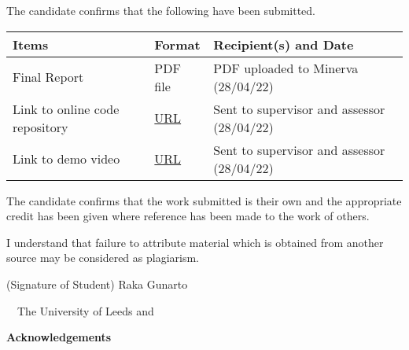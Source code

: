 \frontcover

\clearpage

\noindent The candidate confirms that the following have been submitted.\\


\begin{table}[ht!]
\begin{tabular}{|p{}|p{}|p{}|}
\hline 
Items & Format & Recipient(s) and Date \\ 
\hline 
Final Report & PDF file & PDF uploaded to Minerva (28/04/22) \\ 
\hline 
Link to online code repository & \href{https://gitlab.com/rakagunarto/final-project}{URL} & Sent to supervisor and assessor (28/04/22) \\ 
\hline 
Link to demo video & \href{https://www.youtube.com/watch?v=N4y3nj_2u4U}{URL} & Sent to supervisor and assessor (28/04/22) \\ 
\hline 
\end{tabular} 
\end{table}


\vfill

\noindent The candidate confirms that the work submitted is their own and the appropriate credit has been given where reference has been made to the work of others.

\vfill

\noindent I understand that failure to attribute material which is obtained from another source may be considered as plagiarism.

\vfill

\flushright(Signature of Student) Raka Gunarto
\flushleft

\vfill

\textcopyright~\session~The University of Leeds and~\fullname

\begin{dissertationsummary}

\end{dissertationsummary}

\clearpage
\centering\textbf{Acknowledgements}
\flushleft


\tableofcontents

\clearpage

